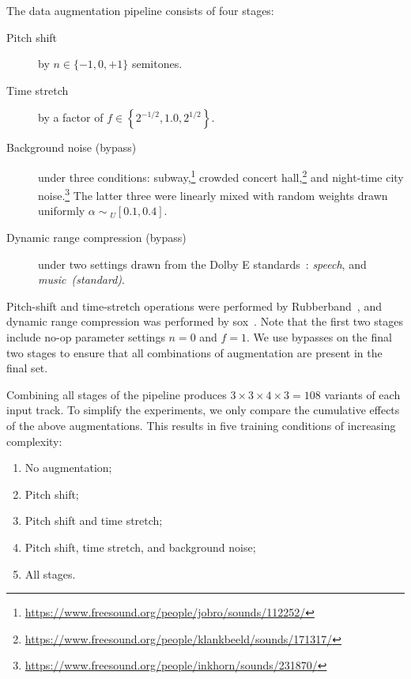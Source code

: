 \documentclass{article}
\begin{document}
The data augmentation pipeline consists of four stages:

\begin{description}
    \item[Pitch shift] by $n \in \{-1, 0, +1\}$ semitones.
    \item[Time stretch] by a factor of $f \in \left\{ 2^{-1/2}, 1.0, 2^{1/2}\right\}$.
    \item[Background noise (bypass)] under three conditions:
        subway,\footnote{\url{https://www.freesound.org/people/jobro/sounds/112252/}}
        crowded concert hall,\footnote{\url{https://www.freesound.org/people/klankbeeld/sounds/171317/}}
        and night-time city noise.\footnote{\url{https://www.freesound.org/people/inkhorn/sounds/231870/}}
        The latter three were linearly mixed with random weights drawn uniformly
        $\alpha \sim { }_U[0.1, 0.4]$.
    \item[Dynamic range compression (bypass)] under two settings drawn from the {Dolby E}
        standards~\cite{dolbyE}: \emph{speech},
        and \emph{music~(standard)}.
\end{description}

Pitch-shift and time-stretch operations were performed by Rubberband~\cite{rubberband}, and dynamic range
compression was performed by sox~\cite{sox}.
Note that the first two stages include no-op parameter settings $n=0$ and $f=1$.  We use
bypasses on the final two stages to ensure that all combinations of augmentation are
present in the final set.

Combining all stages of the pipeline produces {$3\times 3\times 4\times 3 = 108$} variants of each input track.  To
simplify the experiments, we only compare the cumulative effects of the above
augmentations.  This results in five training conditions of increasing complexity:
\begin{enumerate}
    \item No augmentation;
        \vspace{-.5\baselineskip}
    \item Pitch shift;
        \vspace{-.5\baselineskip}
    \item Pitch shift and time stretch;
        \vspace{-.5\baselineskip}
    \item Pitch shift, time stretch, and background noise;
        \vspace{-.5\baselineskip}
    \item All stages.
\end{enumerate}
\end{document}
